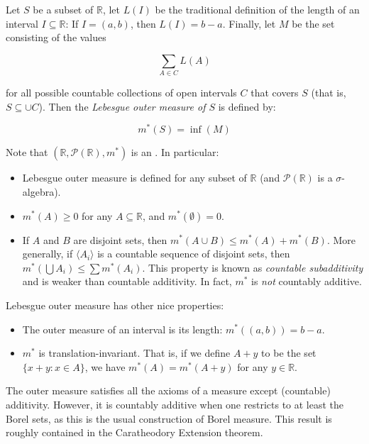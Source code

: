 \documentclass[12pt]{article}
\begin{document}

Let $S$ be a subset of $\mathbb{R}$, let $L(I)$ be the traditional definition of the length of an interval $I \subseteq \mathbb{R}$: If $I = (a, b)$, then $L(I) = b - a$.  Finally, let $M$ be the set consisting of the values

$$\sum_{A\in C}L(A)$$

for all possible countable collections of open intervals $C$ that covers $S$ (that is, $S \subseteq \cup C$).
\medskip
Then the \emph{Lebesgue outer measure of $S$} is defined by:

$$m^{*}(S) = \inf(M)$$

Note that $(\mathbb{R},\mathcal{P}(\mathbb{R}),m^{*})$ is an .  In particular:
\begin{itemize}
\item Lebesgue outer measure is defined for any subset of $\mathbb{R}$ (and $\mathcal{P}(\mathbb{R})$ is a $\sigma$-algebra).
\item $m^{*}(A) \geq 0$ for any $A \subseteq \mathbb{R}$, and $m^{*}(\emptyset) = 0$.
\item If $A$ and $B$ are disjoint sets, then $m^{*}(A \cup B) \leq m^{*}(A) + m^{*}(B)$.  More generally, if $\langle A_i \rangle$ is a countable sequence of disjoint sets, then $m^{*}\left( \bigcup A_i \right) \leq \sum m^{*}(A_i)$.  This property is known as \emph{countable subadditivity} and is weaker than countable additivity.  In fact, $m^{*}$ is \emph{not} countably additive.
\end{itemize}

Lebesgue outer measure has other nice properties:
\begin{itemize}
\item The outer measure of an interval is its length: $m^{*}((a,b)) = b-a$.
\item $m^{*}$ is translation-invariant.  That is, if we define $A + y$ to be the set $\{ x + y : x \in A \}$, we have $m^{*}(A) = m^{*}(A + y)$ for any $y \in \mathbb{R}$.
\end{itemize}

The outer measure satisfies all the axioms of a measure except (countable) additivity.  However, it is countably additive when one restricts to at least the Borel sets, as this is the usual construction of Borel measure.  This result is roughly contained in the Caratheodory Extension theorem.
\end{document}
